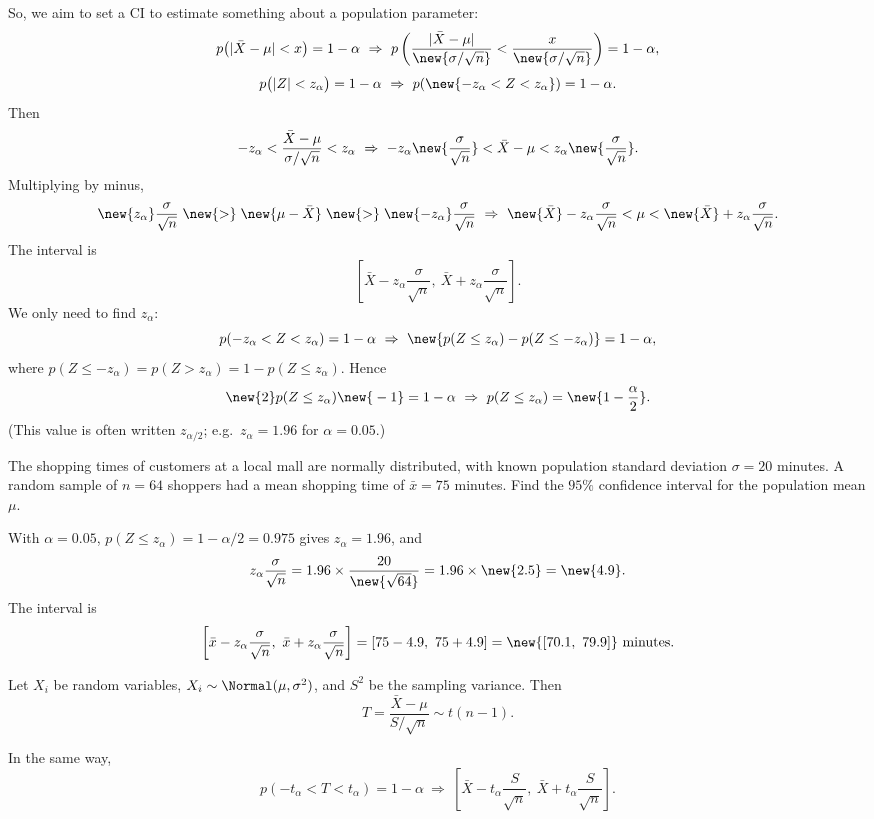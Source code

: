 So, we aim to set a CI to estimate something about a population parameter:
\[
p\big(|\bar X - \mu| < x\big) = 1 - \alpha
\ \Rightarrow\
p\left(\frac{|\bar X - \mu|}{\new{\sigma/\sqrt n}} < \frac{x}{\new{\sigma/\sqrt n}}\right) = 1 - \alpha,
\]
\[
p\big(|Z| < z_\alpha\big) = 1 - \alpha
\ \Rightarrow\
p(\new{-z_\alpha < Z < z_\alpha}) = 1 - \alpha.
\]
Then
\[
-z_\alpha < \frac{\bar X - \mu}{\sigma/\sqrt n} < z_\alpha
\ \Rightarrow\
-z_\alpha\new{\frac{\sigma}{\sqrt n}} < \bar X - \mu < z_\alpha\new{\frac{\sigma}{\sqrt n}}.
\]
Multiplying by minus,
\[
\new{z_\alpha}\frac{\sigma}{\sqrt n} \mathrel{\new{>}} \new{\mu - \bar X} \mathrel{\new{>}} \new{-z_\alpha}\frac{\sigma}{\sqrt n}
\ \Rightarrow\
\new{\bar X} - z_\alpha\frac{\sigma}{\sqrt n} < \mu < \new{\bar X} + z_\alpha\frac{\sigma}{\sqrt n}.
\]
The interval is
\[
\left[\bar X - z_\alpha\frac{\sigma}{\sqrt n},\ \bar X + z_\alpha\frac{\sigma}{\sqrt n}\right].
\]
We only need to find $z_\alpha$:
\[
p(-z_\alpha < Z < z_\alpha) = 1 - \alpha
\ \Rightarrow\
\new{p(Z \le z_\alpha) - p(Z \le -z_\alpha)} = 1 - \alpha,
\]
where $p(Z \le -z_\alpha) = p(Z > z_\alpha) = 1 - p(Z \le z_\alpha)$. Hence
\[
\new{2}p(Z \le z_\alpha) \new{{}- 1} = 1 - \alpha
\ \Rightarrow\
p(Z \le z_\alpha) = \new{1 - \frac{\alpha}{2}}.
\]
(This value is often written $z_{\alpha/2}$; e.g.\ $z_\alpha = 1.96$ for $\alpha = 0.05$.)

\begin{example}
The shopping times of customers at a local mall are normally distributed, with known population standard deviation $\sigma = 20$ minutes. A random sample of $n = 64$ shoppers had a mean shopping time of $\bar x = 75$ minutes. Find the $95\%$ confidence interval for the population mean $\mu$.

With $\alpha = 0.05$, $p(Z \le z_\alpha) = 1 - \alpha/2 = 0.975$ gives $z_\alpha = 1.96$, and
\[
z_\alpha\frac{\sigma}{\sqrt n} = 1.96\times\frac{20}{\new{\sqrt{64}}} = 1.96\times\new{2.5} = \new{4.9}.
\]
The interval is
\[
\left[\bar x - z_\alpha\frac{\sigma}{\sqrt n},\ \bar x + z_\alpha\frac{\sigma}{\sqrt n}\right] = [75 - 4.9,\ 75 + 4.9] = \new{[70.1,\ 79.9]} \text{ minutes}.
\]
\end{example}

\begin{theorem}
Let $X_i$ be random variables, $X_i \sim \Normal(\mu, \sigma^2)$, and $S^2$ be the sampling variance. Then
\[
T = \frac{\bar X - \mu}{S/\sqrt n} \sim t(n-1).
\]
\end{theorem}
In the same way,
\[
p(-t_\alpha < T < t_\alpha) = 1 - \alpha
\ \Rightarrow\
\left[\bar X - t_\alpha\frac{S}{\sqrt n},\ \bar X + t_\alpha\frac{S}{\sqrt n}\right].
\]

